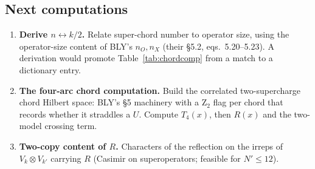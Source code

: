 \documentclass[11pt]{article}
\newcommand{\Np}{N'}
\theoremstyle{remark}
\begin{document}
\subsection{Next computations}
\begin{enumerate}\itemsep1pt
\item \textbf{Derive $n\leftrightarrow k/2$.} Relate super-chord number to operator size, using the operator-size
  content of BLY's $n_O,n_X$ (their \S5.2, eqs.~5.20--5.23). A derivation would promote Table~\ref{tab:chordcomp}
  from a match to a dictionary entry.
\item \textbf{The four-arc chord computation.} Build the correlated two-supercharge chord Hilbert space: BLY's \S5
  machinery with a Z$_2$ flag per chord that records whether it straddles a $U$. Compute $T_4(x)$, then $R(x)$ and the
  two-model crossing term.
\item \textbf{Two-copy content of $R$.} Characters of the reflection on the irreps of $V_k\otimes V_{k'}$ carrying $R$
  (Casimir on superoperators; feasible for $\Np\le12$).
\end{enumerate}

\end{document}
